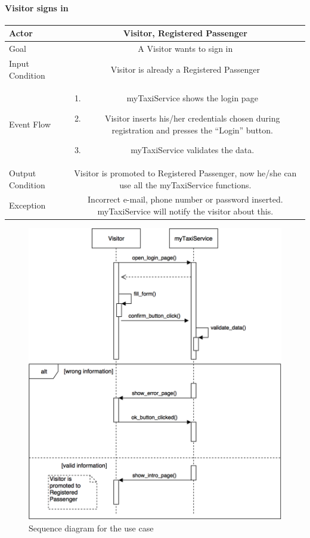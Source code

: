 \documentclass[a4paper,12pt]{article}%
\newcommand{\usecasetable}[6]{
\begin{center}
\def\arraystretch{1.5}
\begin{tabularx}{\textwidth}{|s|C|}
\hline
Actor & #1\\
\hline
Goal & #2\\
\hline
Input Condition & #3 \\
\hline
Event Flow & #4\\
\hline
Output Condition & #5\\
\hline
Exception & #6\\
\hline
\end{tabularx}
\end{center}
}
\begin{document}
\paragraph{Visitor signs in}
\usecasetable {Visitor, Registered Passenger}{A Visitor wants to sign in} {Visitor is already a Registered Passenger} {\begin{minipage}[b]{11cm}
\begin{enumerate}
\item myTaxiService shows the login page
\item Visitor inserts his/her credentials chosen during registration and presses the ``Login'' button.
\item myTaxiService validates the data. 
\end{enumerate}
\end{minipage}
}{Visitor is promoted to Registered Passenger, now he/she can use all the myTaxiService functions.}{Incorrect e-mail, phone number or password inserted. myTaxiService will notify the visitor about this.}
\begin{figure}[H]
\centering
\includegraphics[scale=.3]{passenger_login.png}
\caption{Sequence diagram for the use case}
\end{figure}
\break
\end{document}
